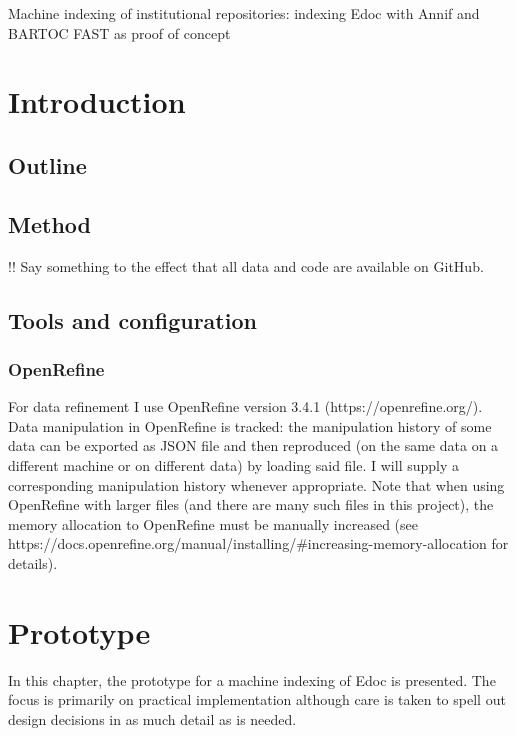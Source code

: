 Machine indexing of institutional repositories: indexing Edoc with Annif
and BARTOC FAST as proof of concept

\hypertarget{introduction}{%
\section{Introduction}\label{introduction}}

\hypertarget{outline}{%
\subsection{Outline}\label{outline}}

\hypertarget{method}{%
\subsection{Method}\label{method}}

!! Say something to the effect that all data and code are available on
GitHub.

\hypertarget{tools-and-configuration}{%
\subsection{Tools and configuration}\label{tools-and-configuration}}

\hypertarget{openrefine}{%
\subsubsection{OpenRefine}\label{openrefine}}

For data refinement I use OpenRefine version 3.4.1
(https://openrefine.org/). Data manipulation in OpenRefine is tracked:
the manipulation history of some data can be exported as JSON file and
then reproduced (on the same data on a different machine or on different
data) by loading said file. I will supply a corresponding manipulation
history whenever appropriate. Note that when using OpenRefine with
larger files (and there are many such files in this project), the memory
allocation to OpenRefine must be manually increased (see
https://docs.openrefine.org/manual/installing/\#increasing-memory-allocation
for details).

\hypertarget{prototype}{%
\section{Prototype}\label{prototype}}

In this chapter, the prototype for a machine indexing of Edoc is
presented. The focus is primarily on practical implementation although
care is taken to spell out design decisions in as much detail as is
needed.

